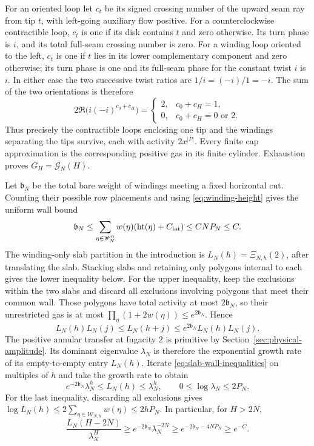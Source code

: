 For an oriented loop let $c_t$ be its signed crossing number of the
upward seam ray from tip $t$, with left-going auxiliary flow positive.
For a counterclockwise contractible loop, $c_t$ is one if its disk
contains $t$ and zero otherwise. Its turn phase is $i$, and its total
full-seam crossing number is zero. For a winding loop oriented to the
left, $c_t$ is one if $t$ lies in its lower complementary component and
zero otherwise; its turn phase is one and its full-seam phase for the
constant twist $i$ is $i$. In either case the two successive twist
ratios are $1/i=(-i)/1=-i$. The sum of the two orientations is therefore
\[
 2\Re\bigl(i(-i)^{c_0+c_H}\bigr)
 =\begin{cases}
   2,&c_0+c_H=1,\\
   0,&c_0+c_H=0\text{ or }2.
  \end{cases}
\]
Thus precisely the contractible loops enclosing one tip and the
windings separating the tips survive, each with activity $2x^{|P|}$.
Every finite cap approximation is the corresponding positive gas in
its finite cylinder. Exhaustion proves $G_H=\mathcal G_N(H)$.

Let $\mathfrak b_N$ be the total bare weight of windings meeting a fixed
horizontal cut. Counting their possible row placements and using
\eqref{eq:winding-height} gives the uniform wall bound
\begin{equation}\label{eq:winding-wall-mass}
 \mathfrak b_N\le\sum_{\eta\in\mathscr W_N^0}w(\eta)
              (\operatorname{ht}(\eta)+C_{\rm lat})
       \le CNP_N\le C.
\end{equation}
The winding-only slab partition in the introduction is
$L_N(h)=\Xi_{N,h}(2)$, after translating the slab. Stacking slabs and
retaining only polygons internal to each gives the lower inequality
below. For the upper inequality, keep the exclusions within the two
slabs and discard all exclusions involving polygons that meet their
common wall. Those polygons have total activity at most
$2\mathfrak b_N$, so their unrestricted gas is at most
$\prod_\eta(1+2w(\eta))\le e^{2\mathfrak b_N}$. Hence
\begin{equation}\label{eq:slab-wall-inequalities}
 L_N(h)L_N(j)\le L_N(h+j)
       \le e^{2\mathfrak b_N}L_N(h)L_N(j).
\end{equation}
The positive annular transfer at fugacity $2$ is primitive by
Section~\ref{sec:physical-amplitude}. Its dominant eigenvalue
$\lambda_N$ is therefore the exponential growth rate of its
empty-to-empty entry $L_N(h)$. Iterate
\eqref{eq:slab-wall-inequalities} on multiples of $h$ and take the
growth rate to obtain
\begin{equation}\label{eq:slab-growth-bounds}
 e^{-2\mathfrak b_N}\lambda_N^h\le L_N(h)\le\lambda_N^h,
 \qquad 0\le\log\lambda_N\le 2P_N.
\end{equation}
For the last inequality, discarding all exclusions gives
$\log L_N(h)\le2\sum_{\eta\in\mathscr W_{N,h}}w(\eta)\le2hP_N$.
In particular, for $H>2N$,
\begin{equation}\label{eq:inward-wall-cost}
 \frac{L_N(H-2N)}{\lambda_N^H}
 \ge e^{-2\mathfrak b_N}\lambda_N^{-2N}
 \ge e^{-2\mathfrak b_N-4NP_N}\ge e^{-C}.
\end{equation}

